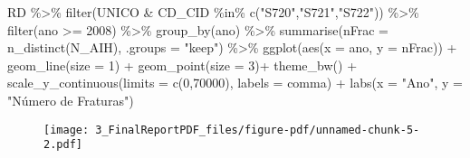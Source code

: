 \documentclass[
  letterpaper,
  DIV=11,
  numbers=noendperiod]{scrartcl}
\newenvironment{Shaded}{\begin{snugshade}}{\end{snugshade}}
\newcommand{\AttributeTok}[1]{\textcolor[rgb]{0.40,0.45,0.13}{#1}}
\newcommand{\DecValTok}[1]{\textcolor[rgb]{0.68,0.00,0.00}{#1}}
\newcommand{\FunctionTok}[1]{\textcolor[rgb]{0.28,0.35,0.67}{#1}}
\newcommand{\NormalTok}[1]{\textcolor[rgb]{0.00,0.23,0.31}{#1}}
\newcommand{\SpecialCharTok}[1]{\textcolor[rgb]{0.37,0.37,0.37}{#1}}
\newcommand{\StringTok}[1]{\textcolor[rgb]{0.13,0.47,0.30}{#1}}
\begin{document}
\begin{Shaded}
\begin{Highlighting}[]
\NormalTok{RD }\SpecialCharTok{\%\textgreater{}\%} 
  \FunctionTok{filter}\NormalTok{(UNICO }\SpecialCharTok{\&}\NormalTok{ CD\_CID }\SpecialCharTok{\%in\%} \FunctionTok{c}\NormalTok{(}\StringTok{"S720"}\NormalTok{,}\StringTok{"S721"}\NormalTok{,}\StringTok{"S722"}\NormalTok{)) }\SpecialCharTok{\%\textgreater{}\%} 
  \FunctionTok{filter}\NormalTok{(ano }\SpecialCharTok{\textgreater{}=} \DecValTok{2008}\NormalTok{) }\SpecialCharTok{\%\textgreater{}\%} 
  \FunctionTok{group\_by}\NormalTok{(ano) }\SpecialCharTok{\%\textgreater{}\%} 
  \FunctionTok{summarise}\NormalTok{(}\AttributeTok{nFrac =} \FunctionTok{n\_distinct}\NormalTok{(N\_AIH), }\AttributeTok{.groups =} \StringTok{"keep"}\NormalTok{) }\SpecialCharTok{\%\textgreater{}\%} 
  \FunctionTok{ggplot}\NormalTok{(}\FunctionTok{aes}\NormalTok{(}\AttributeTok{x =}\NormalTok{ ano, }\AttributeTok{y =}\NormalTok{ nFrac)) }\SpecialCharTok{+}
        \FunctionTok{geom\_line}\NormalTok{(}\AttributeTok{size =} \DecValTok{1}\NormalTok{) }\SpecialCharTok{+}
        \FunctionTok{geom\_point}\NormalTok{(}\AttributeTok{size =} \DecValTok{3}\NormalTok{)}\SpecialCharTok{+}
        \FunctionTok{theme\_bw}\NormalTok{() }\SpecialCharTok{+}
        \FunctionTok{scale\_y\_continuous}\NormalTok{(}\AttributeTok{limits =} \FunctionTok{c}\NormalTok{(}\DecValTok{0}\NormalTok{,}\DecValTok{70000}\NormalTok{), }\AttributeTok{labels =}\NormalTok{ comma) }\SpecialCharTok{+}
        \FunctionTok{labs}\NormalTok{(}\AttributeTok{x =} \StringTok{"Ano"}\NormalTok{, }\AttributeTok{y =} \StringTok{"Número de Fraturas"}\NormalTok{)}
\end{Highlighting}
\end{Shaded}

\begin{figure}[H]

{\centering \texttt{[image: 3\_FinalReportPDF\_files/figure-pdf/unnamed-chunk-5-2.pdf]}

}

\end{figure}
\end{document}
